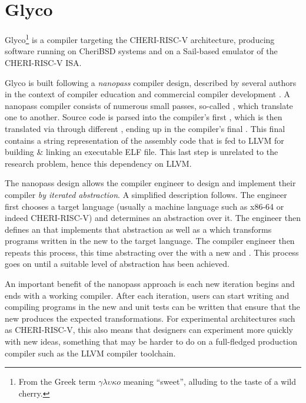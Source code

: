\documentclass[main.tex]{subfiles}
\begin{document}
\onlyinsubfile{\mainmatter{}}

\chapter{Glyco}

Glyco\footnote{From the Greek term $\gamma\lambda\upsilon\kappa{}o$ meaning \enquote{sweet}, alluding to the taste of a wild cherry.} is a compiler targeting the CHERI-RISC-V architecture, producing software running on CheriBSD systems and on a Sail-based emulator of the CHERI-RISC-V ISA.

Glyco is built following a \emph{nanopass} compiler design, described by several authors in the context of compiler education \cite{:educomp} and commercial compiler development \cite{:commcomp}. A nanopass compiler consists of numerous small passes, so-called \emph{\nanopasses{}}, which translate one \emph{\il{}} to another. Source code is parsed into the compiler’s first \il{}, which is then translated via \nanopasses{} through different \ils{}, ending up in the compiler's final \il{}. This final \il{} contains a string representation of the assembly code that is fed to LLVM for building \& linking an executable ELF file. This last step is unrelated to the research problem, hence this dependency on LLVM.

The nanopass design allows the compiler engineer to design and implement their compiler \emph{by iterated abstraction}. A simplified description follows. The engineer first chooses a target language (usually a machine language such as x86-64 or indeed CHERI-RISC-V) and determines an abstraction over it. The engineer then defines an \il{} that implements that abstraction as well as a \nanopass{} which transforms programs written in the new \il{} to the target language. The compiler engineer then repeats this process, this time abstracting over the \il{} with a new \il{} and \nanopass{}. This process goes on until a suitable level of abstraction has been achieved.

An important benefit of the nanopass approach is each new iteration begins and ends with a working compiler. After each iteration, users can start writing and compiling programs in the new \il{} and unit tests can be written that ensure that the new \nanopass{} produces the expected transformations. For experimental architectures such as CHERI-RISC-V, this also means that designers can experiment more quickly with new ideas, something that may be harder to do on a full-fledged production compiler such as the LLVM compiler toolchain.
\end{document}

